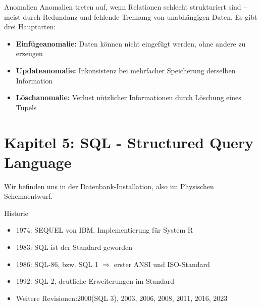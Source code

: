 \documentclass{article}
\begin{document}
\begin{block}{Anomalien}
Anomalien treten auf, wenn Relationen schlecht strukturiert sind – meist durch Redundanz und fehlende Trennung von unabhängigen Daten. Es gibt drei Hauptarten:
\begin{itemize}
  \item \textbf{Einfügeanomalie:} Daten können nicht eingefügt werden, ohne andere zu erzeugen
  \item \textbf{Updateanomalie:} Inkonsistenz bei mehrfacher Speicherung derselben Information
  \item \textbf{Löschanomalie:} Verlust nützlicher Informationen durch Löschung eines Tupels
\end{itemize}
\end{block}

\section{Kapitel 5: SQL - Structured Query Language}

Wir befinden uns in der Datenbank-Installation, also im Physischen Schemaentwurf.

\begin{block}{Historie}
  \begin{itemize}
    \item 1974: SEQUEL von IBM, Implementierung für System R
    \item 1983: SQL ist der Standard geworden
    \item 1986: SQL-86, bzw. SQL 1 $\Rightarrow$ erster ANSI und ISO-Standard
    \item 1992: SQL 2, deutliche Erweiterungen im Standard
    \item Weitere Revisionen:2000(SQL 3), 2003, 2006, 2008, 2011, 2016, 2023
  \end{itemize}
\end{block}
\end{document}
